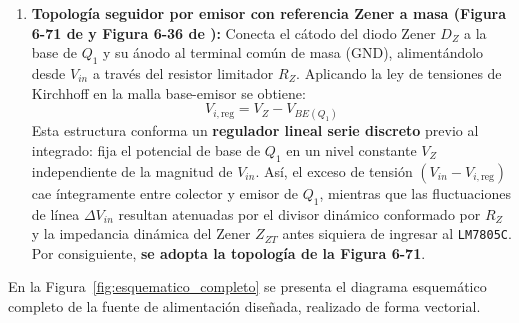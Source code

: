 \begin{enumerate}
    \item \textbf{Topología seguidor por emisor con referencia Zener a masa (Figura 6-71 de \cite{gonzalez_p3} y Figura 6-36 de \cite{gonzalez_p2}):} Conecta el cátodo del diodo Zener $D_Z$ a la base de $Q_1$ y su ánodo al terminal común de masa (GND), alimentándolo desde $V_{in}$ a través del resistor limitador $R_Z$. Aplicando la ley de tensiones de Kirchhoff en la malla base-emisor se obtiene:
    \begin{equation}
        V_{i,\text{reg}} = V_Z - V_{BE(Q_1)}
        \label{eq:vireg_elegida}
    \end{equation}
    Esta estructura conforma un \textbf{regulador lineal serie discreto} previo al integrado: fija el potencial de base de $Q_1$ en un nivel constante $V_Z$ independiente de la magnitud de $V_{in}$. Así, el exceso de tensión $(V_{in} - V_{i,\text{reg}})$ cae íntegramente entre colector y emisor de $Q_1$, mientras que las fluctuaciones de línea $\Delta V_{in}$ resultan atenuadas por el divisor dinámico conformado por $R_Z$ y la impedancia dinámica del Zener $Z_{ZT}$ antes siquiera de ingresar al \texttt{LM7805C}. Por consiguiente, \textbf{se adopta la topología de la Figura 6-71}.
\end{enumerate}

En la Figura~\ref{fig:esquematico_completo} se presenta el diagrama esquemático completo de la fuente de alimentación diseñada, realizado de forma vectorial.

